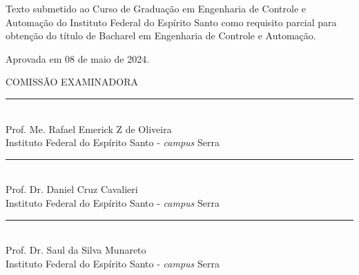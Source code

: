 {
    \center          
    {\large\MakeUppercase{\imprimirautor}}\par
    \vfill
    {\bfseries\large\MakeUppercase\imprimirtitulo}\par
    \vspace{10 mm}
    \hspace{.35\textwidth}
    \begin{minipage}{.6\textwidth}
        \SingleSpacing
        Texto submetido ao Curso de Graduação em Engenharia de Controle e Automação do Instituto Federal do Espírito Santo como requisito parcial para obtenção do título de Bacharel em Engenharia de Controle e Automação. 
    \end{minipage}
    
    \vspace{1.4cm}
    
    Aprovada em 08 de maio de 2024.
    
    \vspace{0.8cm}
    
    \MakeUppercase{Comissão Examinadora}
    
    \vspace{0.8cm}
    
    \rule{12cm}{1pt} \\
    Prof. Me. Rafael Emerick Z de Oliveira \\
    Instituto Federal do Espírito Santo - \textit{campus} Serra
    
    \vspace{0.8cm}
    \rule{12cm}{1pt} \\
    Prof. Dr. Daniel Cruz Cavalieri \\
    Instituto Federal do Espírito Santo - \textit{campus} Serra
    
    \vspace{0.8cm}
    \rule{12cm}{1pt} \\
    Prof. Dr. Saul da Silva Munareto \\
    Instituto Federal do Espírito Santo - \textit{campus} Serra
    
    
    \vfill
    {\large\MakeUppercase\imprimirlocal}\par
    {\large\imprimirdata}\par
}